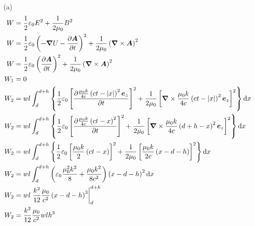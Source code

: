 (a)\begin{align*}
    W&=\frac{1}{2}\varepsilon_0E^2+\frac{1}{2\mu_0}B^2\\
    W&=\frac{1}{2}\varepsilon_0\left(-\boldsymbol{\nabla}U-\frac{\partial\boldsymbol{A}}{\partial t}\right)^2+\frac{1}{2\mu_0}\left(\boldsymbol{\nabla}\times\boldsymbol{A}\right)^2\\
    W&=\frac{1}{2}\varepsilon_0\left(\frac{\partial\boldsymbol{A}}{\partial t}\right)^2+\frac{1}{2\mu_0}\left(\boldsymbol{\nabla}\times\boldsymbol{A}\right)^2\\
    W_1&=0\\
    W_2&=wl\int_{d}^{d+h}\left\{\frac{1}{2}\varepsilon_0\left[\frac{\partial\frac{\mu_0k}{4c}\left(ct-|x|\right)^2\boldsymbol{e}_z}{\partial t}\right]^2+\frac{1}{2\mu_0}\left[\boldsymbol{\nabla}\times\frac{\mu_0k}{4c}\left(ct-|x|\right)^2\boldsymbol{e}_z\right]^2\right\}\dif x\\
    W_2&=wl\int_{d}^{d+h}\left\{\frac{1}{2}\varepsilon_0\left[\frac{\partial\frac{\mu_0k}{4c}\left(ct-x\right)^2}{\partial t}\right]^2+\frac{1}{2\mu_0}\left[\boldsymbol{\nabla}\times\frac{\mu_0k}{4c}\left(d+h-x\right)^2\boldsymbol{e}_z\right]^2\right\}\dif x\\
    W_2&=wl\int_{d}^{d+h}\left\{\frac{1}{2}\varepsilon_0\left[\frac{\mu_0k}{2}\left(ct-x\right)\right]^2+\frac{1}{2\mu_0}\left[\frac{\mu_0k}{2c}\left(x-d-h\right)\right]^2\right\}\dif x\\
    W_2&=wl\int_{d}^{d+h}\left(\varepsilon_0\frac{\mu_0^2k^2}{8}
    +\frac{\mu_0k^2}{8c^2}\right)\left(x-d-h\right)^2\dif x\\
    W_2&=wl\left.\frac{k^2}{12}\frac{\mu_0}{c^2}\left(x-d-h\right)^3\right|_{d}^{d+h}\\
    W_2&=\frac{k^2}{12}\frac{\mu_0}{c^2}wlh^3
\end{align*}


